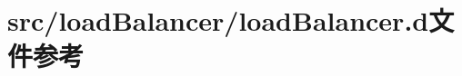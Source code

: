 \hypertarget{src_2loadBalancer_2loadBalancer_8d}{
\section{src/loadBalancer/loadBalancer.d文件参考}
\label{src_2loadBalancer_2loadBalancer_8d}
}
